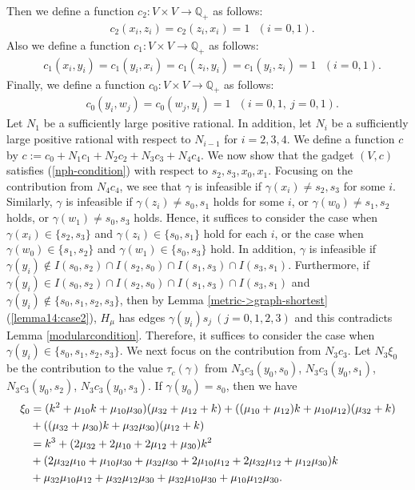 \documentclass[11pt]{article}
\theoremstyle{definition}
\begin{document}
Then we define a function $c_2:V\times V\rightarrow \mathbb{Q}_+$ as follows:
\begin{align}
    &c_2(x_i,z_i)=c_2(z_i,x_i)=1\mathrm{\ \ \ }(i=0,1).
\end{align}
Also we define a function $c_1:V\times V\rightarrow \mathbb{Q}_+$ as follows:
\begin{align}
    &c_1(x_i,y_i)=c_1(y_i,x_i)=c_1(z_i,y_i)=c_1(y_i,z_i)=1\mathrm{\ \ \ }(i=0,1).
\end{align}
Finally, we define a function $c_0:V\times V\rightarrow \mathbb{Q}_+$ as follows:
\begin{align}
    &c_0(y_i,w_j)=c_0(w_j,y_i)=1\mathrm{\ \ \ }(i=0,1,\ j=0,1).
\end{align}
Let $N_1$ be a sufficiently large positive rational. In addition, let $N_i$ be a sufficiently large positive rational with respect to $N_{i-1}$ for $i=2,3,4$. We define a function $c$ by $c:=c_0+N_1c_1+N_2c_2+N_3c_3+N_4c_4$. We now show that the gadget $(V,c)$ satisfies (\ref{nph-condition}) with respect to $s_2,s_3,x_0,x_1$. Focusing on the contribution from $N_4c_4$, we see that $\gamma$ is infeasible if $\gamma(x_i)\neq s_2,s_3$ for some $i$. Similarly, $\gamma$ is infeasible if $\gamma(z_i)\neq s_0,s_1$ holds for some $i$, or $\gamma(w_0)\neq s_1,s_2$ holds, or $\gamma(w_1)\neq s_0,s_3$ holds. Hence, it suffices to consider the case when $\gamma(x_i)\in \{s_2,s_3\}$ and $\gamma(z_i)\in \{s_0,s_1\}$ hold for each $i$, or the case when $\gamma(w_0)\in \{s_1,s_2\}$ and $\gamma(w_1)\in \{s_0,s_3\}$ hold. In addition, $\gamma$ is infeasible if $\gamma(y_i)\notin I(s_0,s_2)\cap I(s_2,s_0)\cap I(s_1,s_3)\cap I(s_3,s_1)$. Furthermore, if $\gamma(y_i)\in I(s_0,s_2)\cap I(s_2,s_0)\cap I(s_1,s_3)\cap I(s_3,s_1)$ and $\gamma(y_i)\notin \{s_0,s_1,s_2,s_3\}$, then by Lemma \ref{metric->graph-shortest} (\ref{lemma14:case2}), $H_\mu$ has edges $\gamma(y_i)s_j\ (j=0,1,2,3)$ and this contradicts Lemma \ref{modularcondition}. Therefore, it suffices to consider the case when $\gamma(y_i)\in \{s_0,s_1,s_2,s_3\}$. We next focus on the contribution from $N_3c_3$. Let $N_3\xi_0$ be the contribution to the value $\tau_{c}(\gamma)$ from $N_3c_3(y_0,s_0)$, $N_3c_3(y_0,s_1)$, $N_3c_3(y_0,s_2)$, $N_3c_3(y_0,s_3)$. If $\gamma(y_0)=s_0$, then we have
\begin{align}
    \xi_0&=(k^2+\mu_{10}k+\mu_{10}\mu_{30})(\mu_{32}+\mu_{12}+k)+((\mu_{10}+\mu_{12})k+\mu_{10}\mu_{12})(\mu_{32}+k)\notag\\&+((\mu_{32}+\mu_{30})k+\mu_{32}\mu_{30})(\mu_{12}+k)\notag\\
    &=k^3+(2\mu_{32}+2\mu_{10}+2\mu_{12}+\mu_{30})k^2\notag\\&+(2\mu_{32}\mu_{10}+\mu_{10}\mu_{30}+\mu_{32}\mu_{30}+2\mu_{10}\mu_{12}+2\mu_{32}\mu_{12}+\mu_{12}\mu_{30})k\notag\\
    &+\mu_{32}\mu_{10}\mu_{12}+\mu_{32}\mu_{12}\mu_{30}+\mu_{32}\mu_{10}\mu_{30}+\mu_{10}\mu_{12}\mu_{30}.
\end{align}
\end{document}
